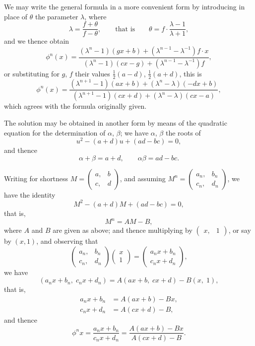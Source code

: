 \documentclass[11pt,a4paper]{book}
\begin{document}
We may write the general formula in a more convenient form by introducing
in place of $\theta$ the parameter $\lambda$, where
%
\[
\lambda = \frac{f+\theta}{f-\theta}, \qquad \text{that is} \qquad
\theta = f \cdot \frac{\lambda - 1}{\lambda + 1},
\]
%
and we thence obtain
%
\[
\phi^n(x) = \frac{(\lambda^n - 1)(gx+b) + (\lambda^{n-1} - \lambda^{-1})f \cdot x}
{(\lambda^n - 1)(cx-g) + (\lambda^{n-1} - \lambda^{-1})f},
\]
%
or substituting for $g$, $f$ their values $\tfrac{1}{2}(a-d)$, $\tfrac{1}{2}(a+d)$, this is
%
\[
\phi^n(x) = \frac{(\lambda^{n+1}-1)(ax+b) + (\lambda^n - \lambda)(-dx+b)}
{(\lambda^{n+1}-1)(cx+d) + (\lambda^n - \lambda)(cx-a)},
\]
%
which agrees with the formula originally given.

The solution may be obtained in another form by means of the quadratic equation
for the determination of $\alpha$, $\beta$; we have $\alpha$, $\beta$ the roots of
%
\[
u^2 - (a+d)u + (ad-bc) = 0,\]
%
and thence
%
\[
\alpha + \beta = a+d, \qquad \alpha\beta = ad-bc.
\]

\newpage


Writing for shortness $M = \left(\begin{array}{c|c} a, & b \\ \hline c, & d \end{array}\right)$,
and assuming $M^n = \left(\begin{array}{c|c} a_n, & b_n \\ \hline c_n, & d_n \end{array}\right)$,
we have the identity
%
\[
M^2 - (a+d)M + (ad-bc) = 0,
\]
%
that is,
%
\[
M^n = AM - B,
\]
%
where $A$ and $B$ are given as above; and thence multiplying by
$\left(\begin{array}{c|c} x, & 1 \end{array}\right)$, or say by $(x, 1)$, and observing that
%
\[
\left(\begin{array}{c|c} a_n, & b_n \\ \hline c_n, & d_n \end{array}\right)
\left(\begin{array}{c} x \\ \hline 1 \end{array}\right)
= \left(\begin{array}{c} a_n x + b_n \\ \hline c_n x + d_n \end{array}\right),
\]
%
we have
%
\[
(a_n x + b_n,\; c_n x + d_n) = A(ax+b,\; cx+d) - B(x,\; 1),
\]
%
that is,
\begin{align*}
a_n x + b_n &= A(ax+b) - Bx, \\
c_n x + d_n &= A(cx+d) - B,
\end{align*}
%
and thence
%
\[
\phi^n x = \frac{a_n x + b_n}{c_n x + d_n}
= \frac{A(ax+b) - Bx}{A(cx+d) - B}.
\]
\end{document}
